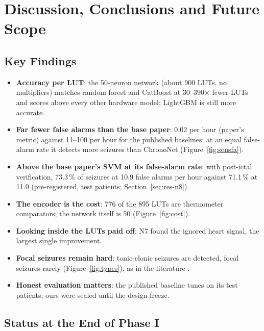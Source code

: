 \chapter{Discussion, Conclusions and Future Scope}\label{ch:concl}

\section{Key Findings}

\begin{itemize}
\item \textbf{Accuracy per LUT}: the 50-neuron network (about 900 LUTs, no multipliers) matches random forest and
  CatBoost at 30--390$\times$ fewer LUTs and scores above every other hardware model; LightGBM is still more accurate.
\item \textbf{Far fewer false alarms than the base paper}: 0.02 per hour (paper's metric) against 11--100 per hour
  for the published baselines; at an equal false-alarm rate it detects more seizures than ChronoNet (Figure~\ref{fig:sensfa}).
\item \textbf{Above the base paper's SVM at its false-alarm rate}: with post-ictal verification, 73.3\,\% of seizures
  at 10.9 false alarms per hour against 71.1\,\% at 11.0 (pre-registered, test patients; Section~\ref{sec:res-n8}).
\item \textbf{The encoder is the cost}: 776 of the 895 LUTs are thermometer comparators; the network itself is 50
  (Figure~\ref{fig:cost}).
\item \textbf{Looking inside the LUTs paid off}: N7 found the ignored heart signal, the largest single improvement.
\item \textbf{Focal seizures remain hard}: tonic-clonic seizures are detected, focal seizures rarely
  (Figure~\ref{fig:types}), as in the literature \cite{beniczky2021guideline}.
\item \textbf{Honest evaluation matters}: the published baseline tunes on its test patients; ours were sealed until the
  design freeze.
\end{itemize}

\section{Status at the End of Phase I}

